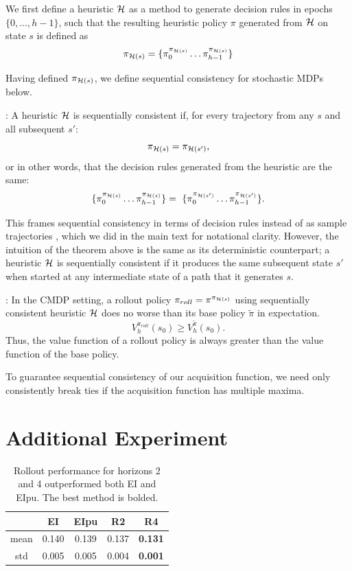 We first define a heuristic ${\mathcal H}$ as a method to generate decision rules in epochs $\{0, \dots, h-1\}$, such that the resulting heuristic policy $\pi$ generated from ${\mathcal H}$ on state $s$ is defined as
\[
\pi_{{\mathcal H}(s)} = \{\pi_0 ^ {\pi_{{\mathcal H}(s)}} \dots \pi_{h-1}^{\pi_{{\mathcal H}(s)}}\}
\]

Having defined $\pi_{{\mathcal H}(s)}$, we define sequential consistency for stochastic MDPs below.  

\begin{definition}
    \citep{goodson2017rollout}: A heuristic ${\mathcal H}$ is sequentially consistent if, for every trajectory from any $s$ and all subsequent $s'$:
    \[
    \pi_{{\mathcal H}(s)} = \pi_{{\mathcal H}(s')},
    \]
    or in other words, that the decision rules generated from the heuristic are the same:
    \[
    \{\pi_0 ^ {\pi_{{\mathcal H}(s)}} \dots \pi_{h-1}^{\pi_{{\mathcal H}(s)}}\} = \ \{\pi_0 ^ {\pi_{{\mathcal H}(s')}} \dots \pi_{h-1}^{\pi_{{\mathcal H}(s')}}\}.
    \]
\end{definition}

This frames sequential consistency in terms of decision rules instead of as sample trajectories \cite{bertsekas1995dynamic}, which we did in the main text for notational clarity. However, the intuition of the theorem above is the same as its deterministic counterpart; a heuristic ${\mathcal H}$ is sequentially consistent if it produces the same subsequent state $s'$ when started at any intermediate state of a path that it generates $s$.

\begin{theorem}
    \citep{bertsekas2005rollout}:
    In the CMDP setting, a rollout policy $\pi_{roll} = \pi^{\pi_{{\mathcal H}(s)}}$ using sequentially consistent heuristic ${\mathcal H}$ does no worse than its base policy $\tilde \pi$ in expectation.
    \[
        V^{\pi_{roll}}_h(s_0) \geq V^{\tilde \pi}_h(s_0).
    \]
    Thus, the value function of a rollout policy is always greater than the value function of the base policy. 
\end{theorem}
To guarantee sequential consistency of our acquisition function, we need only consistently break ties if the acquisition function has multiple maxima. 

\section{Additional Experiment}
 \begin{table}[h]
     \centering
     \begin{tabular}{| c||c|c|c|c |} 
          \hline & EI & EIpu & R2 & R4 \\ \hline
          mean & 0.140 & 0.139 & 0.137 & \textbf{0.131}\\
          std & 0.005 & 0.005 & 0.004 & \textbf{0.001}  \\ \hline
     \end{tabular}
     \caption{Rollout performance for horizons 2 and 4 outperformed both EI and EIpu. The best method is bolded.}
     \label{tab:supp_table}
 \end{table}

